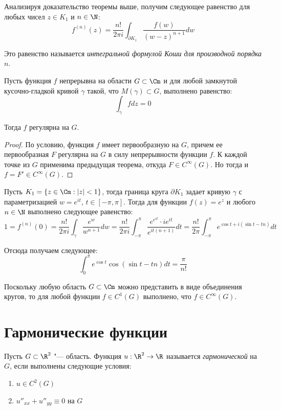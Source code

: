 \begin{note}
	Анализируя доказательство теоремы выше, получим следующее равенство для любых чисел $z \in K_1$ и $n \in \N$:
	\[f^{(n)}(z) = \frac{n!}{2\pi i}\int_{\partial K_1}\frac{f(w)}{(w - z)^{n+1}}dw\]
	
	Это равенство называется \textit{интегральной формулой Коши для производной порядка $n$}.
\end{note}

\begin{theorem}[Мореры]
	Пусть функция $f$ непрерывна на области $G \subset \Cm$ и для любой замкнутой кусочно-гладкой кривой $\gamma$ такой, что $M(\gamma) \subset G$, выполнено равенство:
	\[\int_\gamma fdz = 0\]
	
	Тогда $f$ регулярна на $G$.
\end{theorem}

\begin{proof}
	По условию, функция $f$ имеет первообразную на $G$, причем ее первообразная $F$ регулярна на $G$ в силу непрерывности функции $f$. К каждой точке из $G$ применима предыдущая теорема, откуда $F \in C^\infty(G)$. Но тогда и $f = F' \in C^\infty(G)$.
\end{proof}

\begin{example}
	Пусть $K_1 = \{z \in \Cm: |z| < 1\}$, тогда граница круга $\partial K_1$ задает кривую $\gamma$ с параметризацией $w = e^{it}$, $t \in [-\pi, \pi]$. Тогда для функции $f(z) = e^z$ и любого $n \in \N$ выполнено следующее равенство:
	\[1 = f^{(n)}(0) = \frac{n!}{2\pi i} \int_\gamma \frac{e^w}{w^{n+1}}dw = \frac{n!}{2\pi i} \int_{-\pi}^\pi \frac{e^{e^{it}}\cdot ie^{it}}{e^{it(n+1)}}dt = \frac{n!}{2\pi} \int_{-\pi}^\pi e^{\cos{t} + i(\sin{t} - tn)}dt\]
	
	Отсюда получаем следующее:
	\[\int_{0}^\pi e^{\cos{t}}\cos{(\sin{t} - tn)}dt = \frac\pi{n!}\]
\end{example}

\begin{note}
	Поскольку любую область $G \subset \Cm$ можно представить в виде объединения кругов, то для любой функции $f \in C^1(G)$ выполнено, что $f \in C^\infty(G)$.
\end{note}

\section{Гармонические функции}

\begin{definition}
	Пусть $G \subset \R^2$ "--- область. Функция $u : \R^2 \to \R$ называется \textit{гармонической} на $G$, если выполнены следующие условия:
	\begin{enumerate}
		\item $u \in C^2(G)$
		\item $u''_{xx} + u''_{yy} \equiv 0$ на $G$
	\end{enumerate}
\end{definition}

